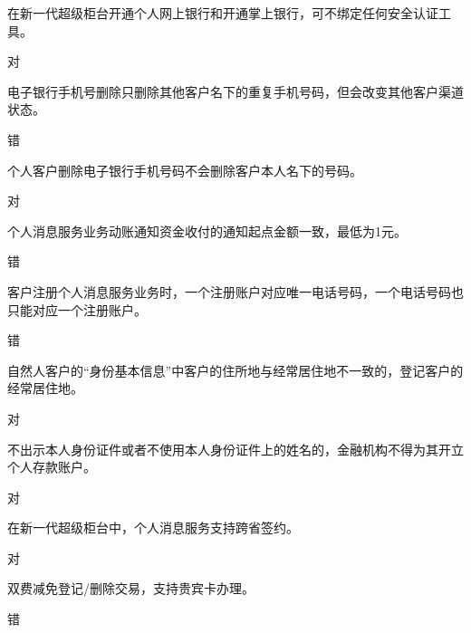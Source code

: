 \documentclass[kindlepaper]{BHCexam4kindle}
\begin{document}
\begin{questions}
\qs 在新一代超级柜台开通个人网上银行和开通掌上银行，可不绑定任何安全认证工具。 \xx
\begin{solution} 对 \end{solution}
\qs 电子银行手机号删除只删除其他客户名下的重复手机号码，但会改变其他客户渠道状态。 \xx
\begin{solution} 错 \end{solution}
\qs 个人客户删除电子银行手机号码不会删除客户本人名下的号码。 \xx
\begin{solution} 对 \end{solution}
\qs 个人消息服务业务动账通知资金收付的通知起点金额一致，最低为1元。 \xx
\begin{solution} 错 \end{solution}
\qs 客户注册个人消息服务业务时，一个注册账户对应唯一电话号码，一个电话号码也只能对应一个注册账户。 \xx
\begin{solution} 错 \end{solution}
\qs 自然人客户的“身份基本信息”中客户的住所地与经常居住地不一致的，登记客户的经常居住地。 \xx
\begin{solution} 对 \end{solution}
\qs 不出示本人身份证件或者不使用本人身份证件上的姓名的，金融机构不得为其开立个人存款账户。 \xx
\begin{solution} 对 \end{solution}
\qs 在新一代超级柜台中，个人消息服务支持跨省签约。 \xx
\begin{solution} 对 \end{solution}
\qs 双费减免登记/删除交易，支持贵宾卡办理。 \xx
\begin{solution} 错 \end{solution}

\end{questions}
\end{document}

